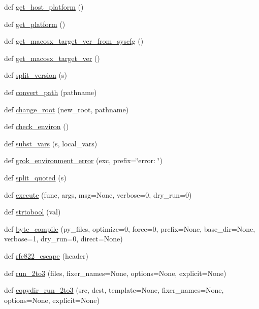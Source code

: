 \begin{DoxyCompactItemize}
\item 
def \hyperlink{namespacesetuptools_1_1__distutils_1_1util_a727a6cf3ec1c48d19d46feaf74c8d7ed}{get\+\_\+host\+\_\+platform} ()
\item 
def \hyperlink{namespacesetuptools_1_1__distutils_1_1util_a2018b70d9c21723b3aa244dc7d44fe43}{get\+\_\+platform} ()
\item 
def \hyperlink{namespacesetuptools_1_1__distutils_1_1util_adcd427d50fb4eb7922e334f7701cbb18}{get\+\_\+macosx\+\_\+target\+\_\+ver\+\_\+from\+\_\+syscfg} ()
\item 
def \hyperlink{namespacesetuptools_1_1__distutils_1_1util_accb59dd43f17299b617d6dc2d635cb47}{get\+\_\+macosx\+\_\+target\+\_\+ver} ()
\item 
def \hyperlink{namespacesetuptools_1_1__distutils_1_1util_a17cc9a66d4d95712cc1647c555ee73d3}{split\+\_\+version} (s)
\item 
def \hyperlink{namespacesetuptools_1_1__distutils_1_1util_ae1cdd02c6b0bef4b045cf5cf465ba690}{convert\+\_\+path} (pathname)
\item 
def \hyperlink{namespacesetuptools_1_1__distutils_1_1util_a6c74fa3bce071280e5e49478ace9d259}{change\+\_\+root} (new\+\_\+root, pathname)
\item 
def \hyperlink{namespacesetuptools_1_1__distutils_1_1util_a5f3b3b53d1c2e1586a5a23e30f5929b3}{check\+\_\+environ} ()
\item 
def \hyperlink{namespacesetuptools_1_1__distutils_1_1util_ae4a55abc4e5fa2c60e615f626bb20535}{subst\+\_\+vars} (s, local\+\_\+vars)
\item 
def \hyperlink{namespacesetuptools_1_1__distutils_1_1util_aacba408fda587df9cf3774b58a7574f4}{grok\+\_\+environment\+\_\+error} (exc, prefix=\char`\"{}error\+: \char`\"{})
\item 
def \hyperlink{namespacesetuptools_1_1__distutils_1_1util_a85372e3f1902fea198901c304990ac42}{split\+\_\+quoted} (s)
\item 
def \hyperlink{namespacesetuptools_1_1__distutils_1_1util_a684b77f15dd1a33223d040956be1d5d8}{execute} (func, args, msg=None, verbose=0, dry\+\_\+run=0)
\item 
def \hyperlink{namespacesetuptools_1_1__distutils_1_1util_ae3c52ad8b869bc1f322a20859bb1a9a5}{strtobool} (val)
\item 
def \hyperlink{namespacesetuptools_1_1__distutils_1_1util_ae71f0c8c828e94dd4644bf5339c75f66}{byte\+\_\+compile} (py\+\_\+files, optimize=0, force=0, prefix=None, base\+\_\+dir=None, verbose=1, dry\+\_\+run=0, direct=None)
\item 
def \hyperlink{namespacesetuptools_1_1__distutils_1_1util_a19549a7afaf2ce022a9686f5e2eda1db}{rfc822\+\_\+escape} (header)
\item 
def \hyperlink{namespacesetuptools_1_1__distutils_1_1util_a9ca6b35db5ee9af95c1dac142eaa2d02}{run\+\_\+2to3} (files, fixer\+\_\+names=None, options=None, explicit=None)
\item 
def \hyperlink{namespacesetuptools_1_1__distutils_1_1util_a8f19d58dfdd1f3f55b8924afe0cf190b}{copydir\+\_\+run\+\_\+2to3} (src, dest, template=None, fixer\+\_\+names=None, options=None, explicit=None)
\end{DoxyCompactItemize}
